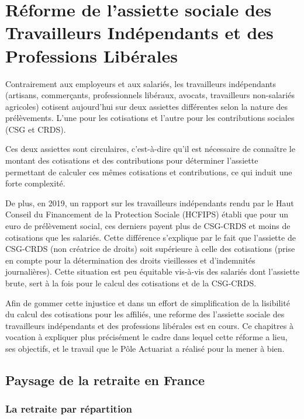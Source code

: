 \chapter{Réforme de l'assiette sociale des Travailleurs Indépendants et des Professions Libérales} %


Contrairement aux employeurs et aux salariés, les travailleurs indépendants (artisans, commerçants, professionnels libéraux, avocats, travailleurs non-salariés agricoles) cotisent aujourd’hui sur deux assiettes différentes selon la nature des prélèvements. L'une pour les cotisations et l'autre pour les contributions sociales (CSG et CRDS).

Ces deux assiettes sont circulaires, c’est-à-dire qu’il est nécessaire de connaître le montant des cotisations et des contributions pour déterminer l’assiette permettant de calculer ces mêmes cotisations et contributions, ce qui induit une forte complexité. 

De plus, en 2019, un rapport sur les travailleurs indépendants rendu par le Haut Conseil du Financement de 
la Protection Sociale (HCFIPS) établi que pour un euro de prélèvement social, ces derniers payent plus de CSG-CRDS et moins de cotisations que les salariés. Cette différence s'explique par le fait que l’assiette de CSG-CRDS (non créatrice de droits) soit supérieure à celle des cotisations (prise en compte pour la détermination des droits vieillesses et d’indemnités journalières). Cette situation est peu équitable vis-à-vis des salariés dont l’assiette brute, sert à la fois pour le calcul des cotisations et de la CSG-CRDS.

Afin de gommer cette injustice et dans un effort de simplification de la lisibilité du calcul des cotisations pour les affiliés, une reforme des l'assiette sociale des travailleurs indépendants et des professions libérales est en cours.
Ce chapitres à vocation à expliquer plus précisément le cadre dans lequel cette réforme a lieu, ses objectifs, et le travail que le Pôle Actuariat a réalisé pour la mener à bien.


\section{Paysage de la retraite en France}


\subsection{La retraite par répartition}


